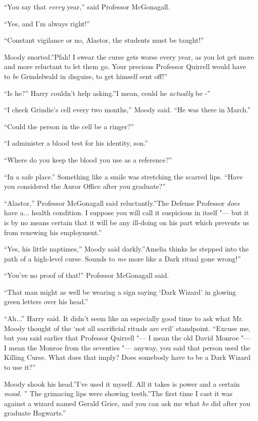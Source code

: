``You say that \emph{every} year,'' said Professor McGonagall.

``Yes, and I'm always right!''

``Constant vigilance or no, Alastor, the students must be taught!''

Moody snorted.''Pfah! I swear the curse gets worse every year, as you
lot get more and more reluctant to let them go. Your precious Professor
Quirrell would have to \emph{be} Grindelwald in disguise, to get himself
sent off!''

``Is he?'' Harry couldn't help asking.''I mean, could he \emph{actually}
be -''

``I check Grindie's cell every two months,'' Moody said. ``He was there
in March.''

``Could the person in the cell be a ringer?''

``I administer a blood test for his identity, son.''

``Where do you keep the blood you use as a reference?''

``In a safe place.'' Something like a smile was stretching the scarred
lips. ``Have you considered the Auror Office after you graduate?''

``Alastor,'' Professor McGonagall said reluctantly.''The Defense
Professor \emph{does} have a... health condition. I suppose you
will call it suspicious in itself "--- but it is by no means certain that
it will be any ill-doing on his part which prevents us from renewing his
employment.''

``Yes, his little naptimes,'' Moody said darkly.''Amelia thinks he
stepped into the path of a high-level curse. Sounds to \emph{me} more
like a Dark ritual gone wrong!''

``You've no proof of that!'' Professor McGonagall said.

``That man might as well be wearing a sign saying `Dark Wizard' in
glowing green letters over his head.''

``Ah...'' Harry said. It didn't seem like an especially good time
to ask what Mr. Moody thought of the `not all sacrificial rituals are
evil' standpoint. ``Excuse me, but you said earlier that Professor
Quirrell "--- I mean the old David Monroe "--- I mean the Monroe from the
seventies "--- anyway, you said that person used the Killing Curse. What
does that imply? Does somebody have to be a Dark Wizard to use it?''

Moody shook his head.''I've used it myself. All it takes is power and a
certain \emph{mood.} '' The grimacing lips were showing teeth.''The first
time I cast it was against a wizard named Gerald Grice, and you can ask
me what \emph{he} did after you graduate Hogwarts.''


